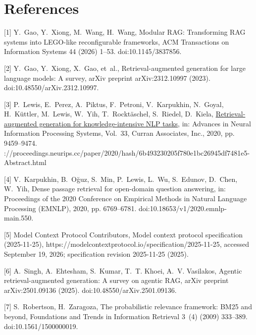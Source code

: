 \documentclass[11pt]{article}
\begin{document}
\section*{References}




[1] 
Y.~Gao, Y.~Xiong, M.~Wang, H.~Wang, Modular {RAG}: Transforming {RAG} systems
  into {LEGO}-like reconfigurable frameworks, ACM Transactions on Information
  Systems 44 (2026) 1--53.
  doi:10.1145/3837856.



[2] 
Y.~Gao, Y.~Xiong, X.~Gao, et~al., Retrieval-augmented generation for large
  language models: A survey, arXiv preprint arXiv:2312.10997 (2023).
  doi:10.48550/arXiv.2312.10997.



[3] 
P.~Lewis, E.~Perez, A.~Piktus, F.~Petroni, V.~Karpukhin, N.~Goyal,
  H.~K{\"u}ttler, M.~Lewis, W.~Yih, T.~Rockt{\"a}schel, S.~Riedel, D.~Kiela,
  \href{https://proceedings.neurips.cc/paper/2020/hash/6b493230205f780e1bc26945df7481e5-Abstract.html}{Retrieval-augmented
  generation for knowledge-intensive {NLP} tasks}, in: Advances in Neural
  Information Processing Systems, Vol.~33, Curran Associates, Inc., 2020, pp.
  9459--9474.
\newlinehttps://proceedings.neurips.cc/paper/2020/hash/6b493230205f780e1bc26945df7481e5-Abstract.html



[4] 
V.~Karpukhin, B.~O{\u{g}}uz, S.~Min, P.~Lewis, L.~Wu, S.~Edunov, D.~Chen,
  W.~Yih, Dense passage retrieval for open-domain question answering, in:
  Proceedings of the 2020 Conference on Empirical Methods in Natural Language
  Processing ({EMNLP}), 2020, pp. 6769--6781.
  doi:10.18653/v1/2020.emnlp-main.550.



[5] 
{Model Context Protocol Contributors}, Model context protocol specification
  (2025-11-25), https://modelcontextprotocol.io/specification/2025-11-25,
  accessed September 19, 2026; specification revision 2025-11-25 (2025).



[6] 
A.~Singh, A.~Ehtesham, S.~Kumar, T.~T. Khoei, A.~V. Vasilakos, Agentic
  retrieval-augmented generation: A survey on agentic {RAG}, arXiv preprint
  arXiv:2501.09136 (2025).
  doi:10.48550/arXiv.2501.09136.



[7] 
S.~Robertson, H.~Zaragoza, The probabilistic relevance framework: {BM25} and
  beyond, Foundations and Trends in Information Retrieval 3~(4) (2009)
  333--389.
  doi:10.1561/1500000019.
\end{document}
